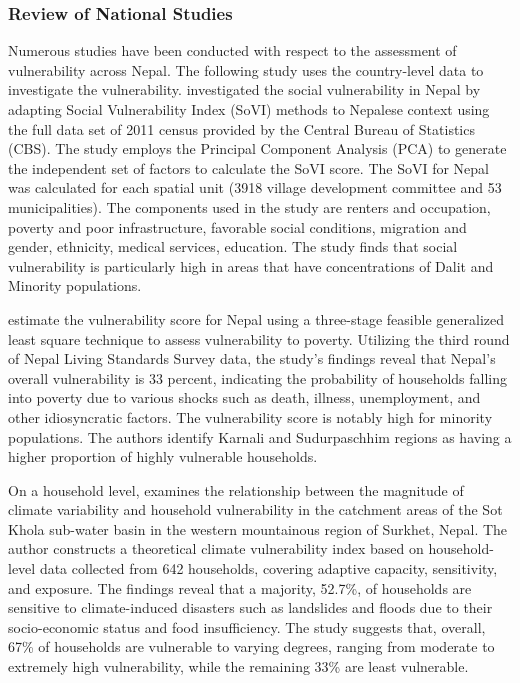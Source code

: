 \subsubsection{Review of National Studies}
Numerous studies have been conducted with respect to the assessment of vulnerability across Nepal. The following study uses the country-level data to investigate the vulnerability. \cite{aksha2019analysis} investigated the social vulnerability in Nepal by adapting Social Vulnerability Index (SoVI) methods to Nepalese context using the full data set of 2011 census provided by the Central Bureau of Statistics (CBS). The study employs the Principal Component Analysis (PCA) to generate the independent set of factors to calculate the SoVI score. The SoVI for Nepal was calculated for each spatial unit (3918 village development committee and 53 municipalities). The components used in the study are renters and occupation, poverty and poor infrastructure, favorable social conditions, migration and gender, ethnicity, medical services, education. The study finds that social vulnerability is particularly high in areas that have concentrations of Dalit and Minority populations.\par    

\cite{shahiestimating} estimate the vulnerability score for Nepal using a three-stage feasible generalized least square technique to assess vulnerability to poverty. Utilizing the third round of Nepal Living Standards Survey data, the study's findings reveal that Nepal's overall vulnerability is 33 percent, indicating the probability of households falling into poverty due to various shocks such as death, illness, unemployment, and other idiosyncratic factors. The vulnerability score is notably high for minority populations. The authors identify Karnali and Sudurpaschhim regions as having a higher proportion of highly vulnerable households.\par 

On a household level, \cite{bista2019grasping} examines the relationship between the magnitude of climate variability and household vulnerability in the catchment areas of the Sot Khola sub-water basin in the western mountainous region of Surkhet, Nepal. The author constructs a theoretical climate vulnerability index based on household-level data collected from 642 households, covering adaptive capacity, sensitivity, and exposure. The findings reveal that a majority, 52.7\%, of households are sensitive to climate-induced disasters such as landslides and floods due to their socio-economic status and food insufficiency. The study suggests that, overall, 67\% of households are vulnerable to varying degrees, ranging from moderate to extremely high vulnerability, while the remaining 33\% are least vulnerable.\par


